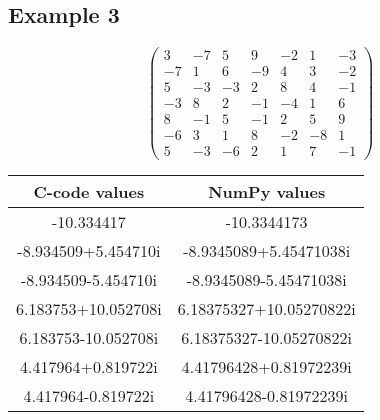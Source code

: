 \documentclass[a4paper, 14pt]{article}
\begin{document}
\subsection*{Example 3}
\[
\begin{pmatrix}
3 & -7 & 5 & 9 & -2 & 1 & -3 \\
-7 & 1 & 6 & -9 & 4 & 3 & -2 \\
5 & -3 & -3 & 2 & 8 & 4 & -1 \\
-3 & 8 & 2 & -1 & -4 & 1 & 6 \\
8 & -1 & 5 & -1 & 2 & 5 & 9 \\
-6 & 3 & 1 & 8 & -2 & -8 & 1 \\
5 & -3 & -6 & 2 & 1 & 7 & -1
\end{pmatrix}
\]
\par
\vspace{1em}
\begin{tabular}{|c|c|}
\hline
\textbf{C-code values}       & \textbf{NumPy values}          \\ \hline
-10.334417                  & -10.3344173                    \\ 
-8.934509+5.454710i         & -8.9345089+5.45471038i         \\ 
-8.934509-5.454710i         & -8.9345089-5.45471038i         \\ 
6.183753+10.052708i         & 6.18375327+10.05270822i        \\ 
6.183753-10.052708i         & 6.18375327-10.05270822i        \\ 
4.417964+0.819722i          & 4.41796428+0.81972239i         \\ 
4.417964-0.819722i          & 4.41796428-0.81972239i         \\ \hline
\end{tabular}
\end{document}

